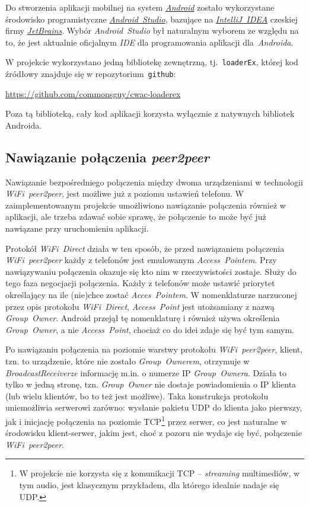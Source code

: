 \documentclass[a4paper,titlepage]{article}
\theoremstyle{break}
\begin{document}
Do stworzenia aplikacji mobilnej na system \emph{\href{http://www.android.com/}{Android}} zostało wykorzystane środowisko programistyczne \href{http://developer.android.com/tools/studio/index.html}{\emph{Android~Studio}}, bazujące na \emph{\href{https://www.jetbrains.com/idea/}{IntelliJ~IDEA}} czeskiej firmy \emph{\href{https://www.jetbrains.com/}{JetBrains}}. Wybór \emph{Android~Studio} był naturalnym wyborem ze względu na to, że jest aktualnie oficjalnym \emph{IDE} dla programowania aplikacji dla~\emph{Androida}.

W projekcie wykorzystano jedną bibliotekę zewnętrzną, tj.~\texttt{loaderEx}, której kod źródłowy znajduje się w repozytorium~\texttt{github}:
\begin{center}
\url{https://github.com/commonsguy/cwac-loaderex}
\end{center}
Poza tą biblioteką, cały kod aplikacji korzysta wyłącznie z natywnych bibliotek Androida.


\subsection{Nawiązanie połączenia \emph{peer2peer}}

Nawiązanie bezpośredniego połączenia między dwoma urządzeniami w technologii \emph{WiFi~peer2peer}, jest możliwe już z poziomu ustawień telefonu. W zaimplementowanym projekcie umożliwiono nawiązanie połączenia również w aplikacji, ale trzeba zdawać sobie sprawę, że połączenie to może być już nawiązane przy uruchomieniu aplikacji.

Protokół \emph{WiFi~Direct} działa w ten sposób, że przed nawiązaniem połączenia \emph{WiFi~peer2peer} każdy z telefonów jest emulowanym \emph{Access~Pointem}. Przy nawiązywaniu połączenia okazuje się kto nim w rzeczywistości zostaje. Służy do tego faza negocjacji połączenia. Każdy z telefonów może ustawić priorytet określający na ile (nie)chce zostać \emph{Acces~Pointem}. W nomenklaturze narzuconej przez opis protokołu \emph{WiFi~Direct}, \emph{Access~Point} jest utożsamiany z nazwą \emph{Group~Owner}. Android przejął tę nomenklaturę i również używa określenia \emph{Group~Owner}, a nie \emph{Access~Point}, chociaż co do idei zdaje się być tym samym.

Po nawiązaniu połączenia na poziomie warstwy protokołu \emph{WiFi~peer2peer}, klient, tzn. to urządzenie, które nie zostało \emph{Group~Ownerem}, otrzymuje w \emph{BroadcastReceiverze} informację m.in. o numerze IP \emph{Group~Ownera}. Działa to tylko w jedną stronę, tzn. \emph{Group~Owner} nie dostaje powiadomienia o IP klienta (lub wielu klientów, bo to też jest możliwe). Taka konstrukcja protokołu uniemożliwia serwerowi zarówno: wysłanie pakietu UDP do klienta jako pierwszy, jak i inicjację połączenia na poziomie TCP\footnote{W projekcie nie korzysta się z komunikacji TCP -- \emph{streaming} multimediów, w tym audio, jest klasycznym przykładem, dla którego idealnie nadaje się UDP.} przez serwer, co jest naturalne w środowisku klient-serwer, jakim jest, choć z pozoru nie wydaje się być, połączenie \emph{WiFi~peer2peer}.
\end{document}
